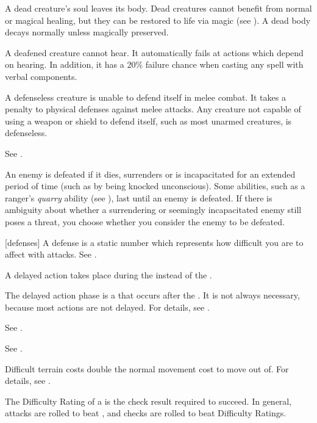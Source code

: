  A dead creature's soul leaves its body. Dead creatures cannot benefit from normal or magical healing, but they can be restored to life via magic (see ). A dead body decays normally unless magically preserved.

 A deafened creature cannot hear. It automatically fails at actions which depend on hearing. In addition, it has a 20\% failure chance when casting any spell with verbal components.

 A defenseless creature is unable to defend itself in melee combat. It takes a  penalty to physical defenses against melee attacks. Any creature not capable of using a weapon or shield to defend itself, such as most unarmed creatures, is defenseless.

 See .

 An enemy is defeated if it dies, surrenders or is incapacitated for an extended period of time (such as by being knocked unconscious).
Some abilities, such as a ranger's \textit{quarry} ability (see ), last until an enemy is defeated.
If there is ambiguity about whether a surrendering or seemingly incapacitated enemy still poses a threat, you choose whether you consider the enemy to be defeated.

[defenses] A defense is a static number which represents how difficult you are to affect with attacks. See .

 A delayed action takes place during the  instead of the .

 The delayed action phase is a  that occurs after the .
It is not always necessary, because most actions are not delayed.
For details, see .

 See .

 See .

 Difficult terrain costs double the normal movement cost to move out of.
For details, see .

 The Difficulty Rating of a  is the check result required to succeed.
In general, attacks are rolled to beat , and checks are rolled to beat Difficulty Ratings.

